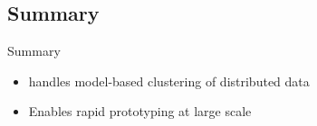 \subsection{Summary}
\makesubcontentsslidessec


\begin{frame}
  \begin{block}{Summary}
    \begin{itemize}
      \item {} handles model-based clustering of
        distributed data
      \item Enables rapid prototyping at large scale
    \end{itemize}
  \end{block}
\end{frame}